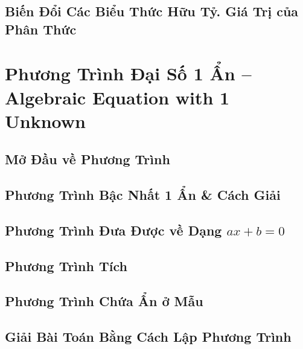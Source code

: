 \documentclass{article}
\numberwithin{equation}{section}
\begin{document}
\subsection{Biến Đổi Các Biểu Thức Hữu Tỷ. Giá Trị của Phân Thức}


\section{Phương Trình Đại Số 1 Ẩn -- Algebraic Equation with 1 Unknown}

\subsection{Mở Đầu về Phương Trình}


\subsection{Phương Trình Bậc Nhất 1 Ẩn \& Cách Giải}


\subsection{Phương Trình Đưa Được về Dạng $ax + b = 0$}


\subsection{Phương Trình Tích}


\subsection{Phương Trình Chứa Ẩn ở Mẫu}


\subsection{Giải Bài Toán Bằng Cách Lập Phương Trình}
\end{document}
